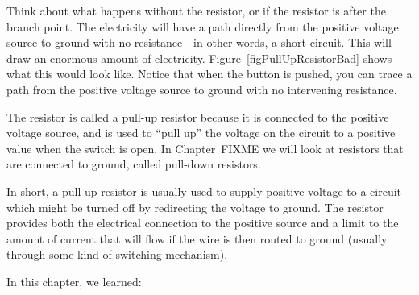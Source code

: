 Think about what happens without the resistor, or if the resistor is after the branch point.
The electricity will have a path directly from the positive voltage source to ground with no resistance---in other words, a short circuit.
This will draw an enormous amount of electricity.
Figure~\ref{figPullUpResistorBad} shows what this would look like.
Notice that when the button is pushed, you can trace a path from the positive voltage source to ground with no intervening resistance.


The resistor is called a pull-up resistor because it is connected to the positive voltage source, and is used to ``pull up'' the voltage on the circuit to a positive value when the switch is open.
In Chapter~FIXME we will look at resistors that are connected to ground, called pull-down resistors.

In short, a pull-up resistor is usually used to supply positive voltage to a circuit which might be turned off by redirecting the voltage to ground.
The resistor provides both the electrical connection to the positive source and a limit to the amount of current that will flow if the wire is then routed to ground (usually through some kind of switching mechanism).

\reviewsection

In this chapter, we learned:

